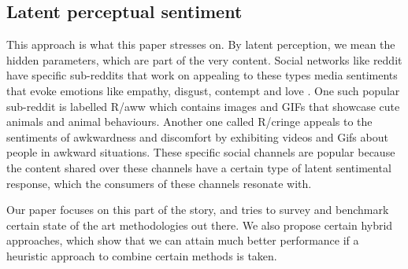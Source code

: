 \subsection{ Latent perceptual sentiment }
This approach is what this paper stresses on. By latent perception, we mean the hidden parameters, which are part of the very content. Social networks like reddit have specific sub-reddits that work on appealing to these types media sentiments that evoke emotions like empathy, disgust, contempt and love . One such popular sub-reddit is labelled R/aww which contains images and GIFs that showcase cute animals and animal behaviours. Another one called R/cringe appeals to the sentiments of awkwardness and discomfort by exhibiting videos and Gifs about people in awkward situations. These specific social channels are popular because the content shared over these channels have a certain type of latent sentimental response, which the consumers of these channels resonate with.
\par
Our paper focuses on this part of the story, and tries to survey and benchmark certain state of the art methodologies out there. We also propose certain hybrid approaches, which show that we can attain much better performance if a heuristic approach to combine certain methods is taken. 